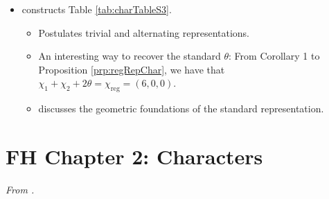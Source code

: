 \documentclass[../notes.tex]{subfiles}
\begin{document}
\begin{itemize}
\begin{proposition}
\begin{proof}
\begin{equation*}
            \end{equation*}
            where
            \begin{equation*}
                (f_s\mid\chi_i) = \frac{1}{g}\sum_{t\in G}f_s(t)\chi_i(t)^*
                = \frac{c(s)}{g}\chi_i(s)^*
            \end{equation*}
            Combining these two results, we obtain the following equivalent formulation of $f_s$.
            \begin{equation*}
                f_s(t) = \frac{c(s)}{g}\sum_{i=1}^h\chi_i(s)^*\chi_i(t)
            \end{equation*}
            If we set $t=s$ in the above equation, we recover (ii). If we set $t\nsim s$ in the above equation, we recover (ii).
        \end{proof}
    \end{proposition}
    \item \textcite{bib:Serre} constructs Table \ref{tab:charTableS3}.
    \begin{itemize}
        \item Postulates trivial and alternating representations.
        \item An interesting way to recover the standard $\theta$: From Corollary 1 to Proposition \ref{prp:regRepChar}, we have that $\chi_1+\chi_2+2\theta=\chi_\text{reg}=(6,0,0)$.
        \item \textcite{bib:Serre} discusses the geometric foundations of the standard representation.
    \end{itemize}
\end{itemize}



\section{FH Chapter 2: Characters}
\setcounter{FHchapter}{2}
\emph{From \textcite{bib:FultonHarris}.}
\end{document}
